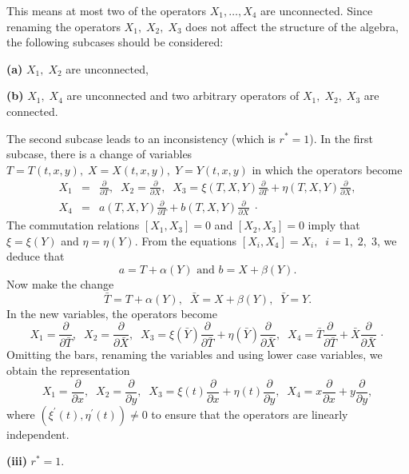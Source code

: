This means at most two of the operators $X_1,\ldots,X_4$ are unconnected. Since
renaming the operators $X_1,\;X_2,\;X_3$ does not affect the structure of
the algebra, the following subcases should be considered:

{\bf (a)} $X_1,\;X_2$  are unconnected,

{\bf (b)} $X_1,\;X_4$ are unconnected and two arbitrary  operators of
$X_1,\;X_2,\;X_3$ are connected.

The second subcase leads to an inconsistency (which is  $r^{*}=1$). In the
first subcase, there is a change of variables $T=T(t,x,y),\;X=X(t,x,y),\;
Y=Y(t,x,y)$ in which the operators become
\begin{eqnarray*}
X_1 &=& \frac{\partial}{\partial T},\;\; X_2=\frac{\partial}{\partial X},\;\;
X_3=\xi (T,X,Y)\frac{\partial}{\partial T}+\eta (T,X,Y)\frac{\partial}
{\partial X},\\
X_4 &= & a(T,X,Y)\frac{\partial}{\partial T}+b(T,X,Y)\frac{\partial}
{\partial X}\;\cdot
\end{eqnarray*}
The commutation relations $[X_1,X_3]=0$ and $[X_2,X_3]=0$ imply that $\xi=\xi (Y)$
and $\eta =\eta (Y)$.
From the equations $[X_i,X_4]=X_i,\;\;i=1,\;2,\;3$, we deduce that
\[a=T+\alpha (Y) \mbox{ and } b=X+\beta (Y).\]
Now make the change
\[\bar T=T+\alpha (Y),\;\;\bar X=X+\beta (Y),\;\; \bar Y=Y.\]
In the new variables, the operators become
\[X_1=\frac{\partial}{\partial \bar T},\;\;X_2=\frac{\partial}{\partial \bar X},
\;\;X_3=\xi (\bar Y)\frac{\partial}{\partial \bar T}+\eta (\bar Y)
\frac{\partial}{\partial \bar X},\;\;X_4=\bar T\frac{\partial}{\partial \bar T}
+\bar X\frac{\partial}{\partial \bar X}\,\cdot\]
Omitting the bars, renaming the variables and using lower case variables, we  
obtain the representation
\begin{equation}
\label{ch6:eq11}
X_1 = \frac{\partial}{\partial x},\;\;X_2=\frac{\partial}{\partial y},\;\; 
X_3=\xi (t) \frac{\partial}{\partial x}+\eta (t)\frac{\partial}{\partial y},\;\;
X_4 = x\frac{\partial}{\partial x}+ y\frac{\partial}
{\partial y},
\end{equation}
where $(\xi^{'}(t),\eta^{'}(t))\ne 0$ to ensure that the operators are
linearly independent.

{\bf (iii)} $r^{*}=1.$

